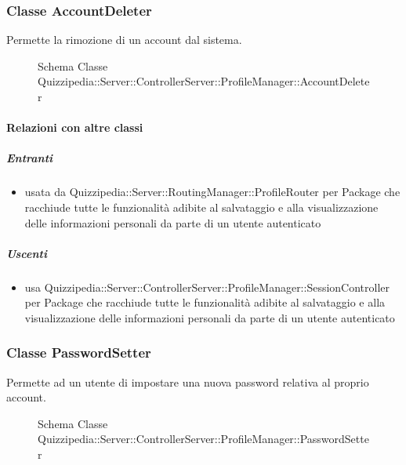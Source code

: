 \subsubsection{Classe AccountDeleter}
Permette la rimozione di un account dal sistema.
\begin{figure}[H]
\centering
\noindent{}
\caption[Schema Classe AccountDeleter]{Schema Classe Quizzipedia::Server::ControllerServer::ProfileManager::AccountDeleter}
\end{figure}
\paragraph{Relazioni con altre classi}
\subparagraph{Entranti}
\begin{itemize}
\item usata da Quizzipedia::Server::RoutingManager::ProfileRouter per Package che racchiude tutte le funzionalità adibite al salvataggio e alla visualizzazione delle informazioni personali da parte di un utente autenticato
\end{itemize}
\subparagraph{Uscenti}
\begin{itemize}
\item usa Quizzipedia::Server::ControllerServer::ProfileManager::SessionController per Package che racchiude tutte le funzionalità adibite al salvataggio e alla visualizzazione delle informazioni personali da parte di un utente autenticato
\end{itemize}
\subsubsection{Classe PasswordSetter}
Permette ad un utente di impostare una nuova password relativa al proprio account.
\begin{figure}[H]
\centering
\noindent{}
\caption[Schema Classe PasswordSetter]{Schema Classe Quizzipedia::Server::ControllerServer::ProfileManager::PasswordSetter}
\end{figure}
